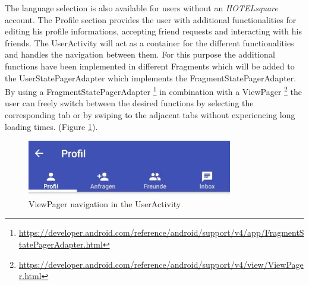 The language selection is also available for users without an \textit{HOTELsquare} account.
The Profile section provides the user with additional functionalities for editing his profile informations, accepting friend requests and interacting with his friends. The UserActivity will act as a container for the different functionalities and handles the navigation between them. For this purpose the additional functions have been implemented in different Fragments which will be added to the UserStatePagerAdapter which implements the FragmentStatePagerAdapter. By using a FragmentStatePagerAdapter \footnote{\url{https://developer.android.com/reference/android/support/v4/app/FragmentStatePagerAdapter.html}} in combination with a ViewPager \footnote{\url{https://developer.android.com/reference/android/support/v4/view/ViewPager.html}} the user can freely switch between the desired functions by selecting the corresponding tab or by swiping to the adjacent tabs without experiencing long loading times. (Figure \ref{fig:profile_tabbar}).
\begin{figure}[htbp]
	\includegraphics[width=0.8\textwidth]{images/profile_tabbar.jpg}
	\centering
	\caption{ViewPager navigation in the UserActivity}\label{fig:profile_tabbar}
\end{figure}

